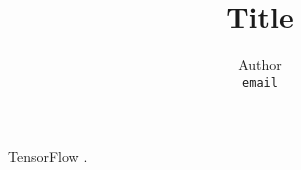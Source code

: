 \documentclass[11pt]{article}
\title{Title}
\author{
  Author\\
  \texttt{email}
}
\date{}
\begin{document}
  \maketitle

  TensorFlow \citep{tf}.


  \setlength{}
  \renewcommand{\bibname}{Bibliography}
  
\end{document}
